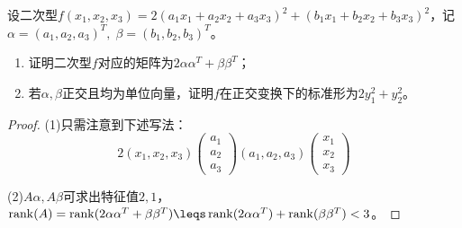 \begin{theorem}
	设二次型$f(x_1,x_2,x_3)=2(a_1x_1+a_2x_2+a_3x_3)^2+(b_1x_1+b_2x_2+b_3x_3)^2$，记$\alpha=(a_1,a_2,a_3)^T,\;\beta=(b_1,b_2,b_3)^T$。
	\begin{enumerate}
		\item 证明二次型$f$对应的矩阵为$2\alpha\alpha^T+\beta\beta^T$；
		\item 若$\alpha,\beta$正交且均为单位向量，证明$f$在正交变换下的标准形为$2y_1^2+y_2^2$。
	\end{enumerate}
\end{theorem}
\begin{proof}
	(1)只需注意到下述写法：
	\begin{equation*}
		2(x_1,x_2,x_3)
		\begin{pmatrix}
			a_1 \\
			a_2 \\
			a_3
		\end{pmatrix}
		(a_1,a_2,a_3)
		\begin{pmatrix}
			x_1 \\
			x_2 \\
			x_3
		\end{pmatrix}
	\end{equation*}\par
	(2)$A\alpha,A\beta$可求出特征值$2,1$，$\operatorname{rank}(A)=\operatorname{rank}(2\alpha\alpha^T+\beta\beta^T)\leqs\operatorname{rank}(2\alpha\alpha^T)+\operatorname{rank}(\beta\beta^T)<3$。
\end{proof}












